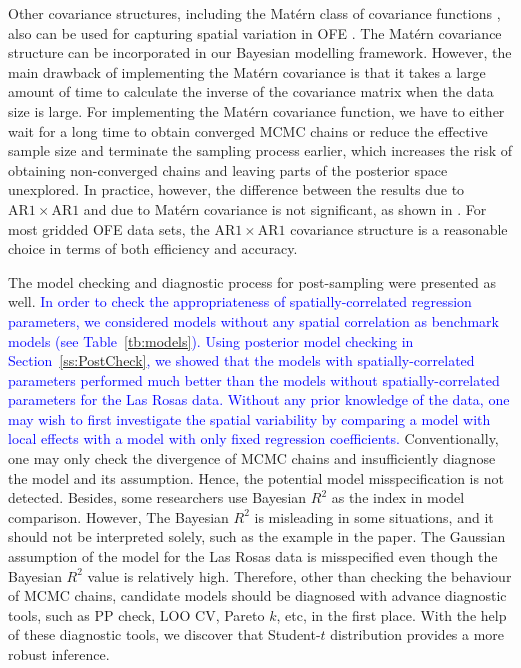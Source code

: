 \documentclass[a4paper]{article}   	%
\newcommand{\AR}{\mathrm{AR}1}
\newcommand{\Matern}{Mat\'ern }
\begin{document}
	Other covariance structures, including the \Matern class of covariance functions \parencite{Cressie1999Classes}, also can be used for capturing spatial variation in OFE \parencite{Selle2019Flexible}. The \Matern covariance structure can be incorporated in our Bayesian modelling framework. %
	However, the main drawback of implementing the \Matern covariance is that it takes a large amount of time to calculate the inverse of the covariance matrix when the data size is large. For implementing the \Matern covariance function, we have to either wait for a long time to obtain converged MCMC chains or reduce the effective sample size and terminate the sampling process earlier, which increases the risk of obtaining non-converged chains and leaving parts of the posterior space unexplored. In practice, however, the difference between the results due to $\AR\times\AR$ and due to \Matern covariance is not significant, as shown in \parencite{Selle2019Flexible}. For most gridded OFE data sets, the $\AR\times\AR$ covariance structure is a reasonable choice in terms of both efficiency and accuracy. 
	
	
	
	The model checking and diagnostic process for post-sampling were presented as well. \textcolor{blue}{In order to check the appropriateness of spatially-correlated regression parameters, we considered models without any spatial correlation as benchmark models (see Table~\ref{tb:models}). Using posterior model checking in Section~\ref{ss:PostCheck}, we showed that the models with spatially-correlated parameters performed much better than the models without spatially-correlated parameters for the Las Rosas data. Without any prior knowledge of the data, one may wish to first investigate the spatial variability by comparing a model with local effects with a model with only fixed regression coefficients.}  Conventionally, one may only check the divergence of MCMC chains and insufficiently diagnose the model and its assumption. Hence, the potential model misspecification is not detected. Besides, some researchers use Bayesian $R^2$ as the index in model comparison. However, The Bayesian $R^2$ is misleading in some situations, and it should not be interpreted solely, such as the example in the paper. The Gaussian assumption of the model for the Las Rosas data is misspecified even though the Bayesian $R^2$ value is relatively high. Therefore, other than checking the behaviour of MCMC chains, candidate models should be diagnosed with advance diagnostic tools, such as PP check, LOO CV, Pareto $k$, etc, in the first place. With the help of these diagnostic tools, we discover that Student-$t$ distribution provides a more robust inference. 
	
\end{document}
